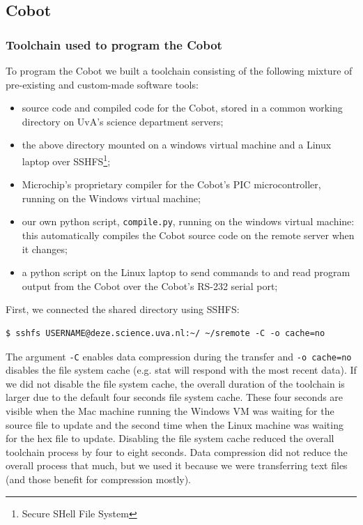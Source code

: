 \documentclass[a4paper,10pt]{article} %
\begin{document}

\subsection{Cobot} %



\subsubsection{Toolchain used to program the Cobot} %
\label{ssub:Toolchain used to program the Cobot}

To program the Cobot we built a toolchain consisting of the following mixture of
pre-existing and custom-made software tools:

\begin{itemize}
    \item source code and compiled code for the Cobot, stored in a common
    working directory on UvA's science department servers;
    \item  the above directory mounted on a windows virtual machine and a Linux
    laptop over SSHFS\footnote{Secure SHell File System};
    \item Microchip's proprietary compiler for the Cobot's PIC microcontroller,
    running on the Windows virtual machine;
    \item our own python script, \texttt{compile.py}, running on the windows
    virtual machine: this automatically compiles the Cobot source code on the
    remote server when it changes;
    \item a python script on the Linux laptop to send commands to and read program
    output from the Cobot over the Cobot's RS-232 serial port;
\end{itemize}

\noindent First, we connected the shared directory using SSHFS:

\begin{verbatim}
$ sshfs USERNAME@deze.science.uva.nl:~/ ~/sremote -C -o cache=no
\end{verbatim}

The argument \texttt{-C} enables data compression during the transfer and
\texttt{-o cache=no} disables the file system cache (e.g. stat will respond with
the most recent data). If we did not disable the file system cache, the overall
duration of the toolchain is larger due to the default four seconds file system
cache. These four seconds are visible when the Mac machine running the Windows
VM was waiting for the source file to update and the second time when the Linux
machine was waiting for the hex file to update. Disabling the file system cache
reduced the overall toolchain process by four to eight seconds. Data compression
did not reduce the overall process that much, but we used it because we were
transferring text files (and those benefit for compression mostly).
\end{document}
